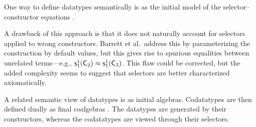 %
%

One way to define datatypes semantically is as the initial model of the
selector--constructor equations \cite{barrett-et-al-2007}.
\begin{rep}
A drawback of this approach is that it does
not naturally account for selectors applied to wrong constructors. Barrett et
al.\ address this by parameterizing the construction by default values, but
this gives rise to spurious equalities between unrelated terms---e.g.,
$\textsf{s}_1^1(\textsf{C}_2) \approx \textsf{s}_1^1(\textsf{C}_3)$. This flaw
could be corrected, but the added complexity seems to suggest that selectors
are better characterized axiomatically.

\end{rep}
A related semantic view of datatypes is as initial algebras. Codatatypes are
then defined dually as final coalgebras \cite{rutten-2000}. The datatypes are
generated by their constructors, whereas the codatatypes are viewed through
their selectors.

